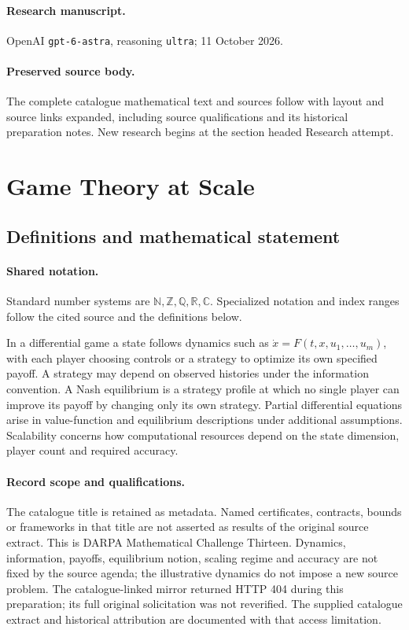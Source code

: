 \documentclass[11pt]{article}
\begin{document}
\paragraph{Research manuscript.} OpenAI \texttt{gpt-6-astra}, reasoning \texttt{ultra}; 11 October 2026.
\paragraph{Preserved source body.} The complete catalogue mathematical text and sources follow with layout and source links expanded, including source qualifications and its historical preparation notes. New research begins at the section headed Research attempt.

\section{Game Theory at Scale}\label{statement}

\subsection{Definitions and mathematical statement}

\paragraph{Shared notation.}Standard number systems are $\mathbb N,\mathbb Z,\mathbb Q,\mathbb R,\mathbb C$. Specialized notation and index ranges follow the cited source and the definitions below.


In a differential game a state follows dynamics such as $\dot x=F(t,x,u_1,\ldots,u_m)$, with each player choosing controls or a strategy to optimize its own specified payoff. A strategy may depend on observed histories under the information convention. A Nash equilibrium is a strategy profile at which no single player can improve its payoff by changing only its own strategy. Partial differential equations arise in value-function and equilibrium descriptions under additional assumptions. Scalability concerns how computational resources depend on the state dimension, player count and required accuracy.
\paragraph{Record scope and qualifications.}
The catalogue title is retained as metadata. Named certificates, contracts, bounds or frameworks in that title are not asserted as results of the original source extract.
This is DARPA Mathematical Challenge Thirteen. Dynamics, information, payoffs, equilibrium notion, scaling regime and accuracy are not fixed by the source agenda; the illustrative dynamics do not impose a new source problem. The catalogue-linked mirror returned HTTP 404 during this preparation; its full original solicitation was not reverified. The supplied catalogue extract and historical attribution are documented with that access limitation.
\end{document}
